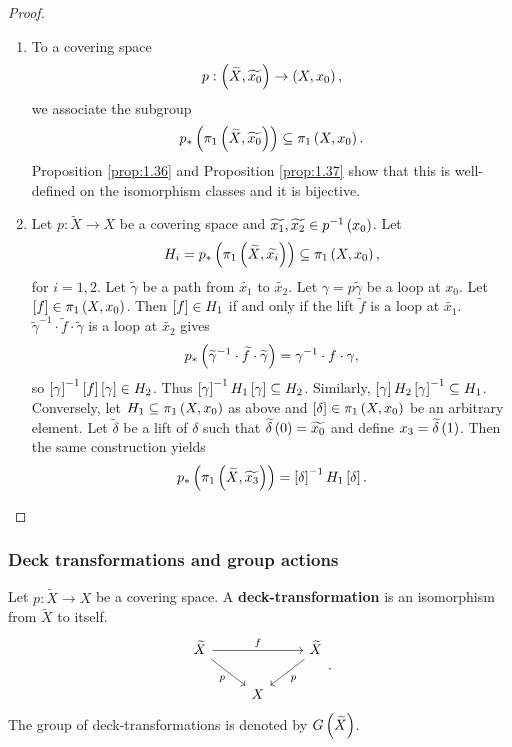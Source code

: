 \begin{proof}
\hfill
\begin{enumerate}
\item To a covering space
$$ p : \rb{\widetilde{X}, \widetilde{x_0}} \to \rb{X, x_0}, $$
we associate the subgroup
$$ p_*\rb{\pi_1\rb{\widetilde{X}, \widetilde{x_0}}} \subseteq \pi_1\rb{X, x_0}. $$
Proposition \ref{prop:1.36} and Proposition \ref{prop:1.37} show that this is well-defined on the isomorphism classes and it is bijective.
\item Let $ p : \widetilde{X} \to X $ be a covering space and $ \widetilde{x_1}, \widetilde{x_2} \in p^{-1}\rb{x_0} $. Let
$$ H_i = p_*\rb{\pi_1\rb{\widetilde{X}, \widetilde{x_i}}} \subseteq \pi_1\rb{X, x_0}, $$
for $ i = 1, 2 $. Let $ \widetilde{\gamma} $ be a path from $ \widetilde{x_1} $ to $ \widetilde{x_2} $. Let $ \gamma = p\widetilde{\gamma} $ be a loop at $ x_0 $. Let $ \sb{f} \in \pi_1\rb{X, x_0} $. Then $ \sb{f} \in H_1 $ if and only if the lift $ \widetilde{f} $ is a loop at $ \widetilde{x_1} $. $ \widetilde{\gamma}^{-1} \cdot \widetilde{f} \cdot \widetilde{\gamma} $ is a loop at $ \widetilde{x_2} $ gives
$$ p_*\rb{\widetilde{\gamma}^{-1} \cdot \widetilde{f} \cdot \widetilde{\gamma}} = \gamma^{-1} \cdot f \cdot \gamma, $$
so $ \sb{\gamma}^{-1}\sb{f}\sb{\gamma} \in H_2 $. Thus $ \sb{\gamma}^{-1}H_1\sb{\gamma} \subseteq H_2 $. Similarly, $ \sb{\gamma}H_2\sb{\gamma}^{-1} \subseteq H_1 $. Conversely, let $ H_1 \subseteq \pi_1\rb{X, x_0} $ as above and $ \sb{\delta} \in \pi_1\rb{X, x_0} $ be an arbitrary element. Let $ \widetilde{\delta} $ be a lift of $ \delta $ such that $ \widetilde{\delta}\rb{0} = \widetilde{x_0} $ and define $ x_3 = \widetilde{\delta}\rb{1} $. Then the same construction yields
$$ p_*\rb{\pi_1\rb{\widetilde{X}, \widetilde{x_3}}} = \sb{\delta}^{-1}H_1\sb{\delta}. $$
\end{enumerate}
\end{proof}

\pagebreak

\subsubsection{Deck transformations and group actions}

\begin{definition*}
Let $ p : \widetilde{X} \to X $ be a covering space. A \textbf{deck-transformation} is an isomorphism from $ \widetilde{X} $ to itself.
$$
\begin{tikzcd}
\widetilde{X} \arrow{rr}{f} \arrow[swap]{dr}{p} & & \widetilde{X} \arrow{dl}{p} \\
& X &
\end{tikzcd}.
$$
The group of deck-transformations is denoted by $ G\rb{\widetilde{X}} $.
\end{definition*}

